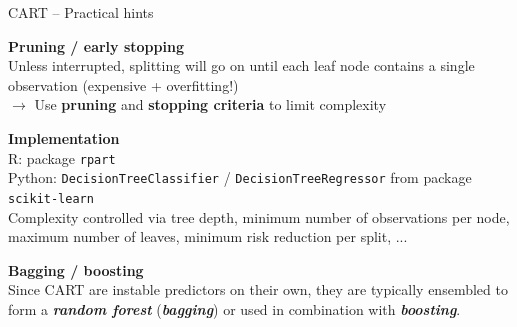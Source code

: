 \documentclass[11pt,compress,t,notes=noshow, xcolor=table]{beamer}
\newcommand{\bfit}[1]{\textbf{\textit{#1}}}
\newcommand{\highlight}[1]{\textcolor{highlightcol}{\textbf{#1}}}
\let\code=\texttt
\begin{document}
\begin{frame}{CART -- Practical hints}

\footnotesize

\highlight{Pruning / early stopping} \\
\smallskip
Unless interrupted, splitting will go on until each leaf node contains a single 
observation (expensive + overfitting!) \\
\smallskip
$\rightarrow$ Use \textbf{pruning} and \textbf{stopping criteria} to limit 
complexity

\lz
\highlight{Implementation} \\
\smallskip
R: package \code{rpart}\\
Python: \code{DecisionTreeClassifier} / \code{DecisionTreeRegressor} from 
package \code{scikit-learn} \\
Complexity controlled via tree depth, minimum number of observations per 
node, maximum number of leaves, minimum risk reduction per split, ...

\lz
\highlight{Bagging / boosting} \\
\smallskip
Since CART are instable predictors on their own, they are typically ensembled
to form a \bfit{random forest} (\bfit{bagging}) or used in combination with 
\bfit{boosting}.

\end{frame}

\end{document}
